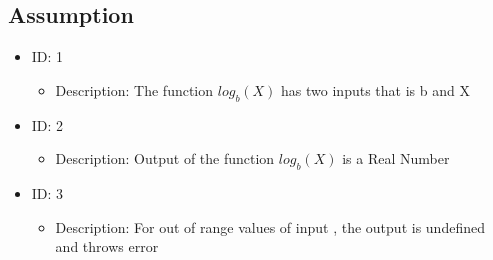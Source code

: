 \documentclass[12pt]{report}
\begin{document}
\subsection{Assumption}
\begin{itemize}
\item ID: 1
\begin{itemize}
\item Description: The function $log_b (X)$ has two inputs that is b and X
\end{itemize}
\item ID: 2
\begin{itemize}
\item Description: Output of the function $log_b (X)$ is a Real Number
\end{itemize}
\item ID: 3
\begin{itemize}
\item Description: For out of range values of input , the output is undefined and throws error
\end{itemize}
\end{itemize}
\end{document}
